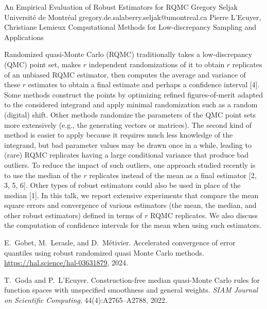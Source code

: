 \begin{talk}
  {An Empirical Evaluation of Robust Estimators for RQMC}%
  {Gregory Seljak}%
  {Universit\'e de Montr\'eal}%
  {gregory.de.salaberry.seljak@umontreal.ca}%
  {Pierre L'Ecuyer, Christiane Lemieux}%
  {Computational Methods for Low-discrepancy Sampling and Applications}%

\medskip

Randomized quasi-Monte Carlo (RQMC) traditionally takes a low-discrepancy (QMC) point set,
makes $r$ independent randomizations of it to obtain $r$ replicates of an unbiased RQMC estimator, 
then computes the average and variance of these $r$ estimates to obtain a final estimate 
and perhaps a confidence interval [4]. 
Some methods construct the points by optimizing refined figures-of-merit adapted to the considered integrand
and apply minimal randomization such as a random (digital) shift.  Other methods randomize
the parameters of the QMC point sets more extensively (e.g., the generating vectors or matrices).
The second kind of method is easier to apply because it requires much less knowledge of the integrand,
but bad parameter values may be drawn once in a while, leading to (rare) RQMC replicates having 
a large conditional variance that produce bad outliers.
To reduce the impact of such outliers, one approach studied recently is to use the median 
of the $r$ replicates instead of the mean as a final estimator [2, 3, 5, 6].
Other types of robust estimators could also be used in place of the median [1].
In this talk, we report extensive experiments that compare the mean square errors 
and convergence of various estimators (the mean, the median, and other robust estimators) 
defined in terms of $r$ RQMC replicates.
We also discuss the computation of confidence intervals for the mean when using such estimators.

{
%
\item
E.~Gobet, M.~Lerasle, and D.~M{\'e}tivier.
Accelerated convergence of error quantiles using robust randomized
  quasi {Monte Carlo} methods.
\url{https://hal.science/hal-03631879}, 2024.

\item
T.~Goda and P.~L'Ecuyer.
Construction-free median quasi-{Monte Carlo} rules for function
  spaces with unspecified smoothness and general weights.
{\em {SIAM} Journal on Scientific Computing}, 44(4):A2765--A2788, 2022.

}
\end{talk}
